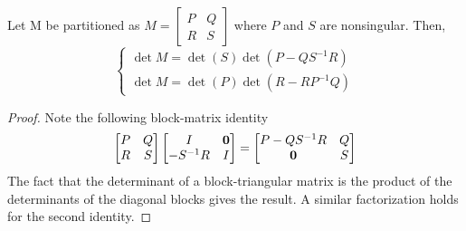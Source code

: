 \begin{lemma}
    Let M be partitioned as $M = \begin{bmatrix}
                                     P & Q\\
                                     R & S
    \end{bmatrix}$ where $P$ and $S$ are nonsingular.
    Then,
    \begin{equation*}
        \begin{cases}
            \det M = \det(S)\det(P - QS^{-1}R)\\
            \det M = \det(P)\det(R - RP^{-1}Q)
        \end{cases}
    \end{equation*}
\end{lemma}
\begin{proof}
    Note the following block-matrix identity
    \begin{equation*}
        \begin{bmatrix}
            P & Q\\
            R & S
        \end{bmatrix}
        \begin{bmatrix}
            I & \mathbf{0}\\
            -S^{-1}R & I
        \end{bmatrix}
        =
        \begin{bmatrix}
            P - QS^{-1}R & Q\\
            \mathbf{0} & S
        \end{bmatrix}
    \end{equation*}
    The fact that the determinant of a block-triangular matrix is the product of the determinants
    of the diagonal blocks gives the result.
    A similar factorization holds for the second identity.
\end{proof}
